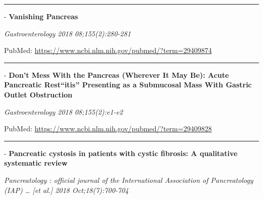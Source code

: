\documentclass[]{article}
\begin{document}
{}

\begin{center}\rule{0.5\linewidth}{\linethickness}\end{center}

 - \textbf{Vanishing Pancreas}

\emph{Gastroenterology 2018 08;155(2):280-281}

PubMed: \url{https://www.ncbi.nlm.nih.gov/pubmed/?term=29409874}

{}

{}

\begin{center}\rule{0.5\linewidth}{\linethickness}\end{center}

 - \textbf{Don't Mess With the Pancreas (Wherever It May Be): Acute
Pancreatic Rest``itis'' Presenting as a Submucosal Mass With Gastric
Outlet Obstruction}

\emph{Gastroenterology 2018 08;155(2):e1-e2}

PubMed: \url{https://www.ncbi.nlm.nih.gov/pubmed/?term=29409828}

{}

{}

\begin{center}\rule{0.5\linewidth}{\linethickness}\end{center}

 - \textbf{Pancreatic cystosis in patients with cystic fibrosis: A
qualitative systematic review}

\emph{Pancreatology : official journal of the International Association
of Pancreatology (IAP) \ldots{} {[}et al.{]} 2018 Oct;18(7):700-704}
\end{document}

